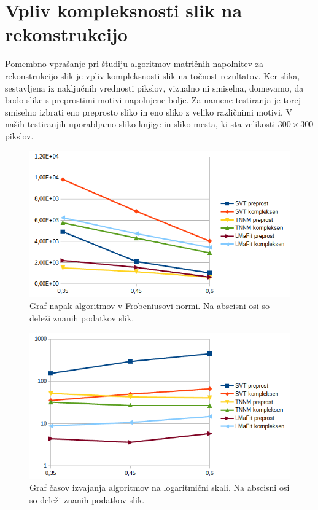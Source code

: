 \section{Vpliv kompleksnosti slik na rekonstrukcijo} \label{1307-2251}
Pomembno vprašanje pri študiju algoritmov matričnih napolnitev za rekonstrukcijo slik je vpliv kompleksnosti slik na točnost rezultatov. Ker slika, sestavljena iz naključnih vrednosti pikslov, vizualno ni smiselna, domevamo, da bodo slike s preprostimi motivi napolnjene bolje. Za namene testiranja je torej smiselno izbrati eno preprosto sliko in eno sliko z veliko različnimi motivi. V naših testiranjih uporabljamo sliko knjige in sliko mesta, ki sta velikosti $300 \times 300$ pikslov.


\begin{figure}[!ht]
    \centering
    \includegraphics[width=\linewidth]{Poglavja/Slike/kompleksnost/kompleksna grayscale 300/kompleksnost.png}
    \caption{Graf napak algoritmov v Frobeniusovi normi. Na abscisni osi so deleži znanih podatkov slik.}
\end{figure}

\begin{figure}[!ht]
    \centering
    \includegraphics[width=\linewidth]{Poglavja/Slike/kompleksnost/kompleksna grayscale 300/cas.png}
    \caption{Graf časov izvajanja algoritmov na logaritmični skali. Na abscisni osi so deleži znanih podatkov slik.}
    \label{1707-1504}
\end{figure}
\FloatBarrier

